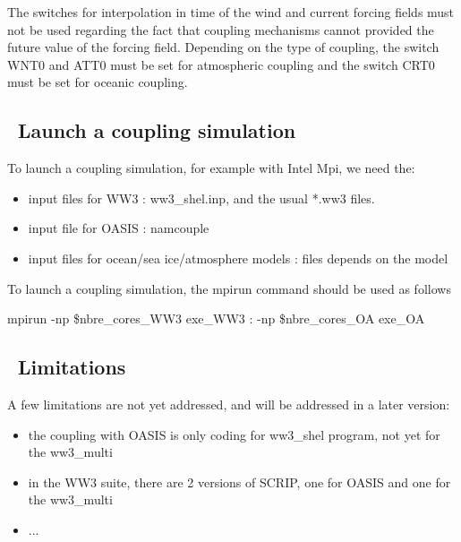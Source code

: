 The switches for interpolation in time of the wind and current forcing fields must not be used regarding the
fact that coupling mechanisms cannot provided the future value of the forcing field.
Depending on the type of coupling, the switch {\code WNT0} and {\code ATT0} must be set for atmospheric coupling and the switch {\code CRT0} must be set for oceanic coupling.

\vssub
\subsection{~Launch a coupling simulation} \label{sec:couplingC}
\vssub

To launch a coupling simulation, for example with Intel Mpi, we need the: 

\begin{itemize}
\item input files for WW3 : {\file ww3\_shel.inp}, and the usual *.ww3 files.
\item input file for OASIS : {\file namcouple}
\item input files for ocean/sea ice/atmosphere models : {\file files depends on the model}
\end{itemize}

To launch a coupling simulation, the {\file mpirun} command should be used as follows

{\code mpirun -np \$nbre\_cores\_WW3 exe\_WW3 : -np \$nbre\_cores\_OA exe\_OA}

\vssub
\subsection{~Limitations} \label{sec:couplingD}
\vssub

A few limitations are not yet addressed, and will be addressed in a later version:

\begin{itemize}
\item the coupling with OASIS is only coding for ww3\_shel program, not yet for the {\code ww3\_multi}
\item in the WW3 suite, there are 2 versions of SCRIP, one for OASIS and one for the {\code ww3\_multi}
\item ...
\end{itemize}
